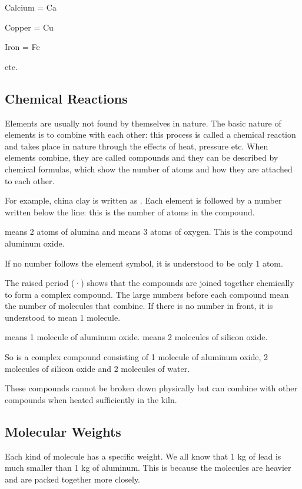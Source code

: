 Calcium = Ca

Copper = Cu

Iron = Fe

etc.
\subsection{Chemical Reactions}
Elements are usually not found by themselves in nature. The basic nature of 
elements is to combine with each other: this process is called a chemical 
reaction and takes place in nature through the effects of heat, pressure etc. 
When elements combine, they are called compounds and they can be described by 
chemical formulas, which show the number of atoms and how they are attached to 
each other.

For example, china clay is written as . Each element is 
followed by a number written below the line: this is the number of atoms in the 
compound.

 means 2 atoms of alumina and  means 3 atoms of oxygen. This is 
the compound aluminum oxide.

If no number follows the element symbol, it is understood to be only 1 atom.

The raised period (·) shows that the compounds are joined together chemically 
to form a complex compound. The large numbers before each compound mean the 
number of molecules that combine. If there is no number in front, it is 
understood to mean 1 molecule.

 means 1 molecule of aluminum oxide.  means 2 molecules of 
silicon oxide.

So  is a complex compound consisting of 1 molecule of 
aluminum oxide, 2 molecules of silicon oxide and 2 molecules of water.

These compounds cannot be broken down physically but can combine with other 
compounds when heated sufficiently in the kiln.
\subsection{Molecular Weights}
Each kind of molecule has a specific weight. We all know that 1 kg of lead is 
much smaller than 1 kg of aluminum. This is because the molecules are heavier 
and are packed together more closely.

